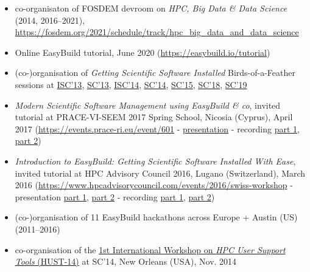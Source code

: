 \begin{itemize}
\item[] co-organisaton of FOSDEM devroom on \emph{HPC, Big Data \& Data Science} (2014, 2016--2021),
    \url{https://fosdem.org/2021/schedule/track/hpc_big_data_and_data_science}
\item[] Online EasyBuild tutorial, June 2020 (\url{https://easybuild.io/tutorial})
\item[] (co-)organisation of \emph{Getting Scientific Software Installed} Birds-of-a-Feather sessions at \href{http://2013.isc-hpc.com/isc13_ap/presentationdetails.php?t=contribution&o=2108&a=select&ra=eventdetails}{ISC'13}, \href{https://github.com/easybuilders/easybuild/wiki/SC13-BoF-session}{SC'13}, \href{https://github.com/easybuilders/easybuild/wiki/ISC'14-BoF-session}{ISC'14}, \href{https://github.com/easybuilders/easybuild/wiki/SC14-BoF-session}{SC'14}, \href{https://github.com/easybuilders/easybuild/wiki/SC15-BoF-session}{SC'15}, \href{https://github.com/easybuilders/easybuild/wiki/SC18-BoF-session-Getting-Scientific-Software-Installed}{SC'18}, \href{https://github.com/easybuilders/easybuild/wiki/SC19-BoF-session-Getting-Scientific-Software-Installed}{SC'19}
\item[] \emph{Modern Scientific Software Management using EasyBuild \& co}, invited tutorial at PRACE-VI-SEEM	2017 Spring School, Nicosia (Cyprus), April 2017 (\url{https://events.prace-ri.eu/event/601} - \href{https://users.ugent.be/~kehoste/EasyBuild_20170425_PRACE_Spring_School.pdf}{presentation} - recording \href{https://www.youtube.com/watch?v=5WNcTHRyDxk}{part 1}, \href{https://www.youtube.com/watch?v=fiv_p87w9XM}{part 2})
\item[] \emph{Introduction to EasyBuild: Getting Scientific Software Installed With Ease}, invited tutorial at HPC Advisory Council 2016, Lugano (Switzerland), March 2016 (\url{https://www.hpcadvisorycouncil.com/events/2016/swiss-workshop} - presentation \href{https://users.ugent.be/~kehoste/EasyBuild_HPCAC_intro_20160323.pdf}{part 1}, \href{https://users.ugent.be/~kehoste/EasyBuild_HPCAC_start_20160323.pdf}{part 2} - recording \href{https://www.youtube.com/watch?v=cL_UcPIIxzE}{part 1},  \href{https://www.youtube.com/watch?v=yo_KwlDtg0w}{part 2})
\item[] (co-)organisation of 11 EasyBuild hackathons across Europe + Austin (US) (2011--2016)
\item[] co-organisation of the \href{http://sc14.supercomputing.org/schedule/event_detail-evid=wksp152.html}{1st International Workshop on \emph{HPC User Support Tools} (HUST-14)} at SC'14, New Orleans (USA), Nov. 2014

\end{itemize}

